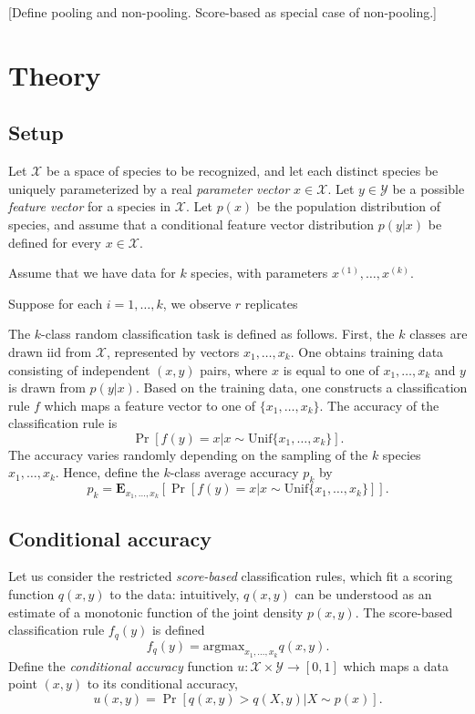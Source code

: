 \documentclass{article}
\newcommand{\E}{\textbf{E}}
\newcommand{\argmax}{\text{argmax}}
\begin{document}
[Define pooling and non-pooling.  Score-based as special case of non-pooling.]

\section{Theory}

\subsection{Setup}

Let $\mathcal{X}$ be a space of species to be recognized, and let each
distinct species be uniquely parameterized by a real \emph{parameter
  vector} $x \in \mathcal{X}$.  Let $y \in \mathcal{Y}$ be a possible
\emph{feature vector} for a species in $\mathcal{X}$.  Let $p(x)$ be
the population distribution of species, and assume that a conditional
feature vector distribution $p(y|x)$ be defined for every $x \in
\mathcal{X}$.

Assume that we have data for $k$ species, with parameters $x^{(1)},\hdots, x^{(k)}$.

Suppose for each $i = 1,\hdots, k$, we observe $r$ replicates 

The $k$-class random classification task is defined as follows.
First, the $k$ classes are drawn iid from $\mathcal{X}$, represented
by vectors $x_1,\hdots, x_k$.  One obtains training data consisting of
independent $(x, y)$ pairs, where $x$ is equal to one of $x_1,\hdots,
x_k$ and $y$ is drawn from $p(y|x)$.  Based on the training data, one
constructs a classification rule $f$ which maps a feature vector to
one of $\{x_1,\hdots, x_k\}$.  The accuracy of the classification rule
is
\[
\Pr[f(y) = x|x \sim \text{Unif}\{x_1,\hdots, x_k\}].
\]
The accuracy varies randomly depending on the sampling of the $k$
species $x_1,\hdots, x_k$.
Hence, define the $k$-class average accuracy $p_k$ by
\[
p_k = \E_{x_1,\hdots, x_k}[\Pr[f(y) = x|x \sim \text{Unif}\{x_1,\hdots, x_k\}]].
\]




\subsection{Conditional accuracy}



Let us consider the restricted \emph{score-based} classification
rules, which fit a scoring function $q(x, y)$ to the data:
intuitively, $q(x, y)$ can be understood as an estimate of a monotonic
function of the joint density $p(x, y)$.  The score-based
classification rule $f_q(y)$ is defined
\[
f_q(y) = \argmax_{x_1,\hdots, x_k} q(x, y).
\]
Define the \emph{conditional accuracy} function $u: \mathcal{X} \times \mathcal{Y} \to [0,1]$
which maps a data point $(x, y)$ to its conditional accuracy,
\[
u(x, y) = \Pr[q(x, y) > q(X, y)|X \sim p(x)].
\] 
\end{document}
